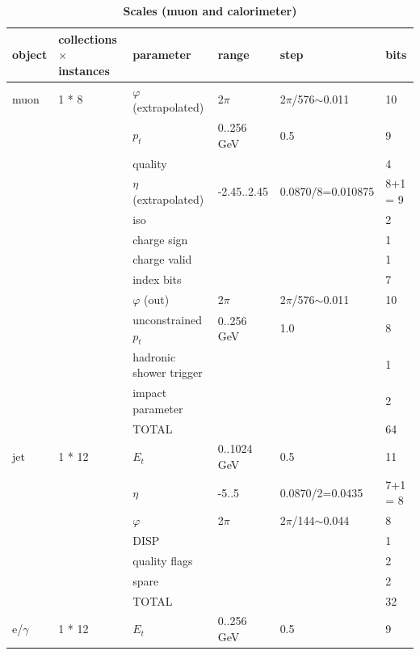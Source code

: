 \documentclass{cmspaper}
\begin{document}
\begin{table}[ht]
\caption{\bf Scales (muon and calorimeter)}
\vspace{5mm}
\centering
\begin{tabular}{| l | l | l | l | l | l |}
\hline
object	&	collections $\times$ instances	&	parameter	&	range	&	step	&	bits \\
\hline\hline
muon	&	1 * 8	&	$\varphi$ (extrapolated)&	2$\pi$	&	2$\pi$/576$\sim$0.011	&	10 \\
	&		&	$p_t$	&	0..256 GeV 	&	0.5	&	9                    \\
	&		&	quality	&		&		&	4                    \\
	&		&	$\eta$ (extrapolated)	&	-2.45..2.45	&	0.0870/8=0.010875	&	8+1 = 9 \\
	&		&	iso	&		&		&	2                    \\
	&		&	charge sign	&		&		&	1                    \\
	&		&	charge valid	&		&		&	1                    \\
	&		&	index bits	&		&		&	7                    \\
	&		&	$\varphi$ (out) &	2$\pi$	&	2$\pi$/576$\sim$0.011	&	10 \\
	&		&	unconstrained $p_t$	&	0..256 GeV 	&	1.0	&	8                    \\
	&		&	hadronic shower trigger	&		&		&	1                    \\
	&		&	impact parameter	&		&		&	2                    \\
	&		&	TOTAL	&		&		&	64                    \\
\hline
jet	&	1 * 12	&	$E_t$	&	0..1024 GeV	&	0.5	&	11                    \\
	&		&	$\eta$	&	-5..5	&	0.0870/2=0.0435	&	7+1 = 8                    \\
	&		&	$\varphi$	&	2$\pi$	&	2$\pi$/144$\sim$0.044	&	8                    \\
	&		&	DISP	&		&		&	1                    \\
	&		&	quality flags	&		&		&	2                    \\
	&		&	spare	&		&		&	2                    \\
	&		&	TOTAL	&		&		&	32                    \\
\hline
e/$\gamma$	&	1 * 12	&	$E_t$	&	0..256 GeV	&	0.5	&	9                    \\

\end{tabular}
\end{table}
\end{document}
